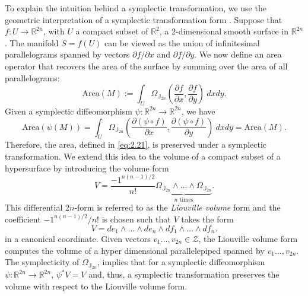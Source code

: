 To explain the intuition behind a symplectic transformation, we use the geometric interpretation of a symplectic transformation form \cite{hairer2006geometric}. Suppose that $f:U \to \mathbb R^{2n}$, with $U$ a compact subset of $\mathbb R^{2}$, a 2-dimensional smooth surface in $\mathbb R^{2n}$. The manifold $S = f(U)$ can be viewed as the union of infinitesimal parallelograms spanned by vectors ${\partial f}/{\partial x}$ and ${\partial f}/{\partial y}$. We now define an area operator that recovers the area of the surface by summing over the area of all parallelograms:
\begin{equation} \label{eq:2.21}
	\text{Area}(M) := \int_U \Omega_{\mathbb J_{2n}}( \frac{\partial f}{\partial x} , \frac{\partial f}{\partial y} ) \ dx dy.
\end{equation}
Given a symplectic diffeomorphism $\psi:\mathbb R^{2n} \to \mathbb R^{2n}$, we have
\begin{equation*}
	\text{Area}(\psi(M)) = \int_U \Omega_{\mathbb J_{2n}}( \frac{\partial (\psi \circ f) }{\partial x} , \frac{\partial (\psi \circ f)}{\partial y} ) \ dx dy = \text{Area}(M).
\end{equation*}
Therefore, the area, defined in \eqref{eq:2.21}, is preserved under a symplectic transformation. We extend this idea to the volume of a compact subset of a hypersurface by introducing the volume form
\begin{equation*}
	V = \frac{-1^{n(n-1)/2}}{n!} \underbrace{\Omega_{\mathbb J_{2n}} \wedge \dots \wedge \Omega_{\mathbb J_{2n}}}_{n \text{ times}}.
\end{equation*}
This differential $2n$-form is referred to as the  \emph{Liouville volume} \cite{marsden2013introduction} form and the coefficient ${-1^{n(n-1)/2}}/{n!}$ is chosen such that $V$ takes the form
\begin{equation}\label{eq:2.22}
	V = de_1 \wedge \dots \wedge de_n \wedge df_1 \wedge \dots \wedge df_n. 
\end{equation}
in a canonical coordinate. Given vectors $v_1\dots,v_{2n}\in \mathcal Z$, the Liouville volume form computes the volume of a hyper dimensional parallelepiped spanned by $v_1\dots,v_{2n}$. The symplecticity of $\Omega_{\mathbb J_{2n}}$, implies that for a symplectic diffeomorphism $\psi:\mathbb R^{2n} \to \mathbb{R}^{2n}$, $\psi^*V = V$ and, thus, a symplectic transformation preserves the volume with respect to the Liouville volume form.

